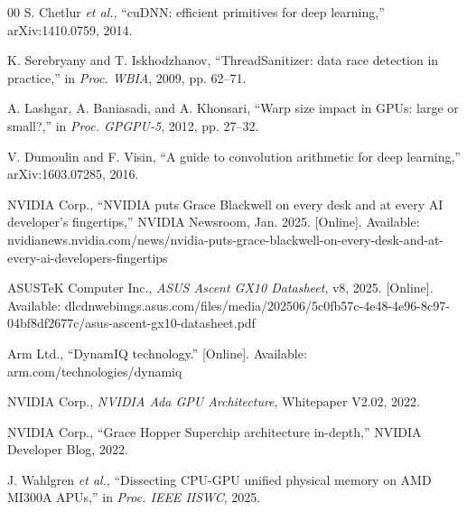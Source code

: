 \documentclass[conference]{IEEEtran}
\begin{document}
\begin{thebibliography}{00}
 S. Chetlur \emph{et al.}, ``cuDNN: efficient primitives for deep learning,'' arXiv:1410.0759, 2014.

 K. Serebryany and T. Iskhodzhanov, ``ThreadSanitizer: data race detection in practice,'' in \emph{Proc. WBIA}, 2009, pp. 62--71.

 A. Lashgar, A. Baniasadi, and A. Khonsari, ``Warp size impact in GPUs: large or small?,'' in \emph{Proc. GPGPU-5}, 2012, pp. 27--32.

 V. Dumoulin and F. Visin, ``A guide to convolution arithmetic for deep learning,'' arXiv:1603.07285, 2016.

 NVIDIA Corp., ``NVIDIA puts Grace Blackwell on every desk and at every AI developer's fingertips,'' NVIDIA Newsroom, Jan. 2025. [Online]. Available: nvidianews.nvidia.com/news/nvidia-puts-grace-blackwell-on-every-desk-and-at-every-ai-developers-fingertips

 ASUSTeK Computer Inc., \emph{ASUS Ascent GX10 Datasheet}, v8, 2025. [Online]. Available: dlcdnwebimgs.asus.com/files/media/202506/5c0fb57c-4e48-4e96-8c97-04bf8df2677c/asus-ascent-gx10-datasheet.pdf

 Arm Ltd., ``DynamIQ technology.'' [Online]. Available: arm.com/technologies/dynamiq

 NVIDIA Corp., \emph{NVIDIA Ada GPU Architecture}, Whitepaper V2.02, 2022.

 NVIDIA Corp., ``Grace Hopper Superchip architecture in-depth,'' NVIDIA Developer Blog, 2022.

 J. Wahlgren \emph{et al.}, ``Dissecting CPU-GPU unified physical memory on AMD MI300A APUs,'' in \emph{Proc. IEEE IISWC}, 2025.

\end{thebibliography}
\end{document}
